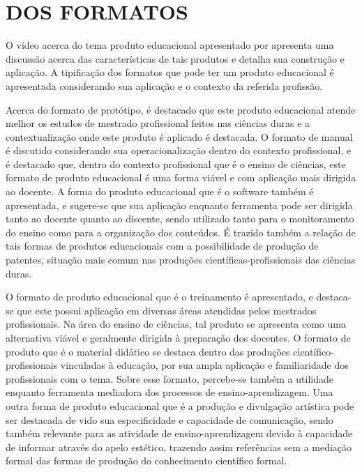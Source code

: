 \documentclass[
   article,       %
   12pt,          %
   oneside,       %
   a4paper,       %
   english,       %
   brazil,           %
   sumario=tradicional
   ]{abntex2}
\begin{document}

\frenchspacing 


\maketitle


\newpage

\textual
\section{DOS FORMATOS}

O vídeo acerca do tema produto educacional apresentado por  apresenta uma discussão acerca das características de tais produtos e detalha sua construção e aplicação. A tipificação dos formatos que pode ter um produto educacional é apresentada considerando sua aplicação e o contexto da referida profissão.

Acerca do formato de protótipo, é destacado que este produto educacional atende melhor os estudos de mestrado profissional feitos nas ciências duras e a contextualização onde este produto é aplicado é destacada. O formato de manual é discutido considerando sua operacionalização dentro do contexto profissional, e é destacado que, dentro do contexto profissional que é o ensino de ciências, este formato de produto educacional é uma forma viável e com aplicação mais dirigida ao docente. A forma do produto educacional que é o software também é apresentada, e sugere-se que sua aplicação enquanto ferramenta pode ser dirigida tanto ao docente quanto ao discente, sendo utilizado tanto para o monitoramento do ensino como para a organização dos conteúdos. É trazido também a relação de tais formas de produtos educacionais com a possibilidade de produção de patentes, situação mais comum nas produções científicas-profissionais das ciências duras. 

O formato de produto educacional que é o treinamento é apresentado, e destaca-se que este possui aplicação em diversas áreas atendidas pelos mestrados profissionais. Na área do ensino de ciências, tal produto se apresenta como uma alternativa viável e geralmente dirigida à preparação dos docentes. O formato de produto que é o material didático se destaca dentro das produções científico-profissionais vinculadas à educação, por sua ampla aplicação e familiaridade dos profissionais com o tema. Sobre esse formato, percebe-se também a utilidade enquanto ferramenta mediadora dos processos de ensino-aprendizagem. Uma outra forma de produto educacional que é a produção e divulgação artística pode ser destacada de vido sua especificidade e capacidade de comunicação, sendo também relevante para as atividade de ensino-aprendizagem devido à capacidade de informar através do apelo estético, trazendo assim referências sem a mediação formal das formas de produção do conhecimento científico formal.
\end{document}
